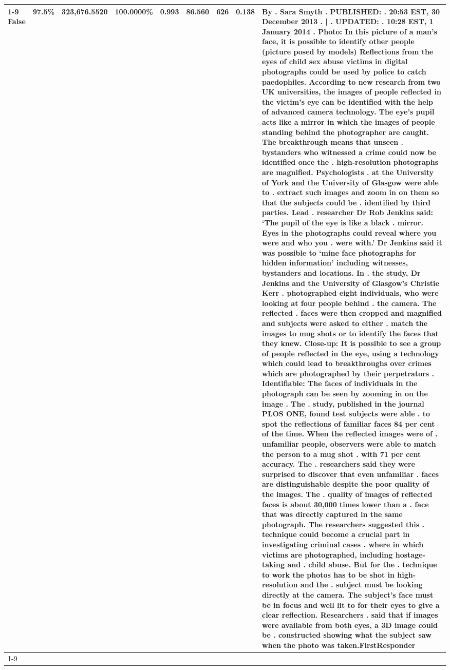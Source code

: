 \begin{table}[H]
\begin{tabular}{lllrlllll}
\cline{1-9} \cline{2-9}
False & 97.5\% & 323,676.5520 & \bfseries \color{red} 100.0000\% & 0.993 & 86.560 & 626 & 0.138 & By . Sara Smyth . PUBLISHED: . 20:53 EST, 30 December 2013 . | . UPDATED: . 10:28 EST, 1 January 2014 . Photo: In this picture of a man's face, it is possible to identify other people (picture posed by models) Reflections from the eyes of child sex abuse victims in digital photographs could be used by police to catch paedophiles. According to new research from two UK universities, the images of people reflected in the victim's eye can be identified with the help of advanced camera technology. The eye's pupil acts like a mirror in which the images of people standing behind the photographer are caught. The breakthrough means that unseen . bystanders who witnessed a crime could now be identified once the . high-resolution photographs are magnified. Psychologists . at the University of York and the University of Glasgow were able to . extract such images and zoom in on them so that the subjects could be . identified by third parties. Lead . researcher Dr Rob Jenkins said: ‘The pupil of the eye is like a black . mirror. Eyes in the photographs could reveal where you were and who you . were with.' Dr Jenkins said it was possible to ‘mine face photographs for hidden information' including witnesses, bystanders and locations. In . the study, Dr Jenkins and the University of Glasgow's Christie Kerr . photographed eight individuals, who were looking at four people behind . the camera. The reflected . faces were then cropped and magnified and subjects were asked to either . match the images to mug shots or to identify the faces that they knew. Close-up: It is possible to see a group of people reflected in the eye, using a technology which could lead to breakthroughs over crimes which are photographed by their perpetrators . Identifiable: The faces of individuals in the photograph can be seen by zooming in on the image . The . study, published in the journal PLOS ONE, found test subjects were able . to spot the reflections of familiar faces 84 per cent of the time. When the reflected images were of . unfamiliar people, observers were able to match the person to a mug shot . with 71 per cent accuracy. The . researchers said they were surprised to discover that even unfamiliar . faces are distinguishable despite the poor quality of the images. The . quality of images of reflected faces is about 30,000 times lower than a . face that was directly captured in the same photograph. The researchers suggested this . technique could become a crucial part in investigating criminal cases . where in which victims are photographed, including hostage-taking and . child abuse. But for the . technique to work the photos has to be shot in high-resolution and the . subject must be looking directly at the camera. The subject's face must be in focus and well lit to for their eyes to give a clear reflection. Researchers . said that if images were available from both eyes, a 3D image could be . constructed showing what the subject saw when the photo was taken.FirstResponder \\
\cline{1-9} \cline{2-9}
\bottomrule
\end{tabular}
\end{table}
